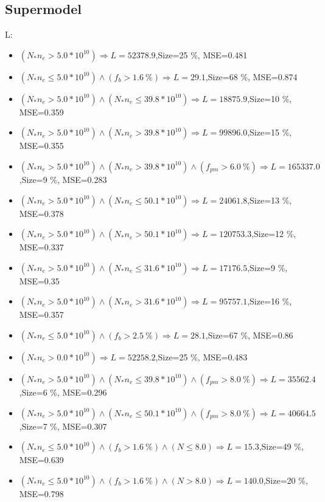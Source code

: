 \documentclass[numbered]{CSL}
\begin{document}
\subsection{Supermodel}
L:
\begin{itemize}
\item $(N_* n_e > 5.0 * 10^{10}) \Rightarrow L = 52378.9$,\hfill Size=25 \%, MSE=0.481
\item $(N_* n_e \leq 5.0 * 10^{10}) \land (f_b > 1.6~\%) \Rightarrow L = 29.1$,\hfill Size=68 \%, MSE=0.874
\item $(N_* n_e > 5.0 * 10^{10}) \land (N_* n_e \leq 39.8 * 10^{10}) \Rightarrow L = 18875.9$,\hfill Size=10 \%, MSE=0.359
\item $(N_* n_e > 5.0 * 10^{10}) \land (N_* n_e > 39.8 * 10^{10}) \Rightarrow L = 99896.0$,\hfill Size=15 \%, MSE=0.355
\item $(N_* n_e > 5.0 * 10^{10}) \land (N_* n_e > 39.8 * 10^{10}) \land (f_{pm} > 6.0~\%) \Rightarrow L = 165337.0$,\hfill Size=9 \%, MSE=0.283
\item $(N_* n_e > 5.0 * 10^{10}) \land (N_* n_e \leq 50.1 * 10^{10}) \Rightarrow L = 24061.8$,\hfill Size=13 \%, MSE=0.378
\item $(N_* n_e > 5.0 * 10^{10}) \land (N_* n_e > 50.1 * 10^{10}) \Rightarrow L = 120753.3$,\hfill Size=12 \%, MSE=0.337
\item $(N_* n_e > 5.0 * 10^{10}) \land (N_* n_e \leq 31.6 * 10^{10}) \Rightarrow L = 17176.5$,\hfill Size=9 \%, MSE=0.35
\item $(N_* n_e > 5.0 * 10^{10}) \land (N_* n_e > 31.6 * 10^{10}) \Rightarrow L = 95757.1$,\hfill Size=16 \%, MSE=0.357
\item $(N_* n_e \leq 5.0 * 10^{10}) \land (f_b > 2.5~\%) \Rightarrow L = 28.1$,\hfill Size=67 \%, MSE=0.86
\item $(N_* n_e > 0.0 * 10^{10}) \Rightarrow L = 52258.2$,\hfill Size=25 \%, MSE=0.483
\item $(N_* n_e > 5.0 * 10^{10}) \land (N_* n_e \leq 39.8 * 10^{10}) \land (f_{pm} > 8.0~\%) \Rightarrow L = 35562.4$,\hfill Size=6 \%, MSE=0.296
\item $(N_* n_e > 5.0 * 10^{10}) \land (N_* n_e \leq 50.1 * 10^{10}) \land (f_{pm} > 8.0~\%) \Rightarrow L = 40664.5$,\hfill Size=7 \%, MSE=0.307
\item $(N_* n_e \leq 5.0 * 10^{10}) \land (f_b > 1.6~\%) \land (N \leq 8.0) \Rightarrow L = 15.3$,\hfill Size=49 \%, MSE=0.639
\item $(N_* n_e \leq 5.0 * 10^{10}) \land (f_b > 1.6~\%) \land (N > 8.0) \Rightarrow L = 140.0$,\hfill Size=20 \%, MSE=0.798

\end{itemize}
\end{document}
